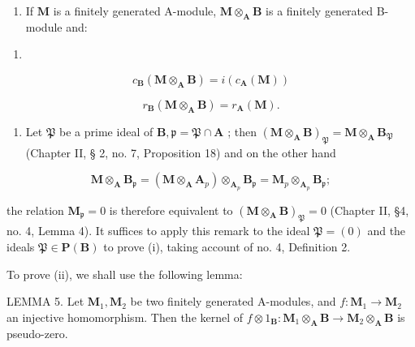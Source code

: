 \begin{enumerate}
\def\labelenumi{(\roman{enumi})}
\setcounter{enumi}{2}
\tightlist
\item
  If \(\mathbf{M}\) is a finitely generated A-module, \(\mathbf{M} \otimes_{\mathbf{A}} \mathbf{B}\) is a finitely generated B-module and:
\end{enumerate}

\begin{enumerate}
\def\labelenumi{(\arabic{enumi})}
\setcounter{enumi}{22}
\tightlist
\item
\end{enumerate}

\[
c _ {\mathbf {B}} (\mathbf {M} \otimes_ {\mathbf {A}} \mathbf {B}) = i (c _ {\mathbf {A}} (\mathbf {M}))\tag{24}
\]

\[
r _ {\mathbf {B}} (\mathbf {M} \otimes_ {\mathbf {A}} \mathbf {B}) = r _ {\mathbf {A}} (\mathbf {M}).
\]

\begin{enumerate}
\def\labelenumi{(\roman{enumi})}
\tightlist
\item
  Let \(\mathfrak{P}\) be a prime ideal of \(\mathbf{B},\mathfrak{p} = \mathfrak{P}\cap \mathbf{A}\) ; then \((\mathbf{M}\otimes_{\mathbf{A}}\mathbf{B})_{\mathfrak{P}} = \mathbf{M}\otimes_{\mathbf{A}}\mathbf{B}_{\mathfrak{P}}\) (Chapter II, § 2, no. 7, Proposition 18) and on the other hand
\end{enumerate}

\[
\mathbf {M} \otimes_ {\mathbf {A}} \mathbf {B} _ {\mathfrak {p}} = (\mathbf {M} \otimes_ {\mathbf {A}} \mathbf {A} _ {p}) \otimes_ {\mathbf {A} _ {p}} \mathbf {B} _ {\mathfrak {p}} = \mathbf {M} _ {p} \otimes_ {\mathbf {A} _ {p}} \mathbf {B} _ {\mathfrak {p}};
\]

the relation \(\mathbf{M}_{\mathfrak{p}} = 0\) is therefore equivalent to \((\mathbf{M} \otimes_{\mathbf{A}} \mathbf{B})_{\mathfrak{P}} = 0\) (Chapter II, §4, no. 4, Lemma 4). It suffices to apply this remark to the ideal \(\mathfrak{P} = (0)\) and the ideals \(\mathfrak{P} \in \mathbf{P}(\mathbf{B})\) to prove (i), taking account of no. 4, Definition 2.

To prove (ii), we shall use the following lemma:

LEMMA 5. Let \(\mathbf{M}_1, \mathbf{M}_2\) be two finitely generated A-modules, and \(f: \mathbf{M}_1 \to \mathbf{M}_2\) an injective homomorphism. Then the kernel of \(f \otimes 1_{\mathbf{B}}: \mathbf{M}_1 \otimes_{\mathbf{A}} \mathbf{B} \to \mathbf{M}_2 \otimes_{\mathbf{A}} \mathbf{B}\) is pseudo-zero.

